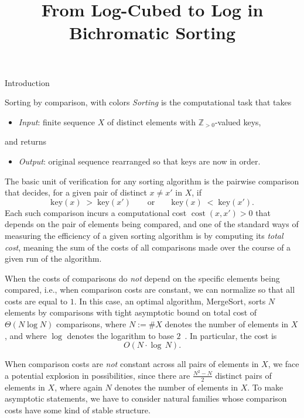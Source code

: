 \documentclass[11pt]{article}
\title{From Log-Cubed to Log in Bichromatic Sorting}
\theoremstyle{definition}
\numberwithin{equation}{section}
\begin{document}
\maketitle

\begin{section}{Introduction}
\begin{humanblock}
\begin{subsection}{Sorting by comparison, with colors}
{\em Sorting} is the computational task that takes
    \begin{itemize}[label=$\bullet$]
    \item {\em Input}: finite sequence $X$ of distinct elements with $\mathbb{Z}_{>0}$-valued keys,
    \end{itemize}
and returns
    \begin{itemize}[label=$\bullet$]
    \item {\em Output}: original sequence rearranged so that keys are now in order.
    \end{itemize}
The basic unit of verification for any sorting algorithm is the pairwise comparison that decides, for a given pair of distinct $x\neq x'$ in $X$, if
$$
\text{key}(x)\;>\;\text{key}(x')\quad\quad\text{or}\quad\quad\text{key}(x)\;<\;\text{key}(x').
$$
Each such comparison incurs a computational cost $\operatorname{cost}(x,x')>0$ that depends on the pair of elements being compared, and one of the standard ways of measuring the efficiency of a given sorting algorithm is by computing its {\em total cost}, meaning the sum of the costs of all comparisons made over the course of a given run of the algorithm.

When the costs of comparisons do {\em not} depend on the specific elements being compared, i.e., when comparison costs are constant, we can normalize so that all costs are equal to $1$. In this case, an optimal algorithm, {\ttfamily MergeSort}, sorts $N$ elements by comparisons with tight asymptotic bound on total cost of $\Theta(N \log N)$ comparisons, where $N:=\#X$ denotes the number of elements in $X$, and where $\log$ denotes the logarithm to base $2$~\cite{knuth1998art}. In particular, the cost is
$$
O(N\cdot\operatorname{log}\,N).
$$

When comparison costs are {\em not} constant across all pairs of elements in $X$, we face a potential explosion in possibilities, since there are $\frac{N^2-N}{2}$ distinct pairs of elements in $X$, where again $N$ denotes the number of elements in $X$. To make asymptotic statements, we have to consider natural families whose comparison costs have some kind of stable structure.


\end{subsection}
\end{humanblock}
\end{section}
\end{document}
